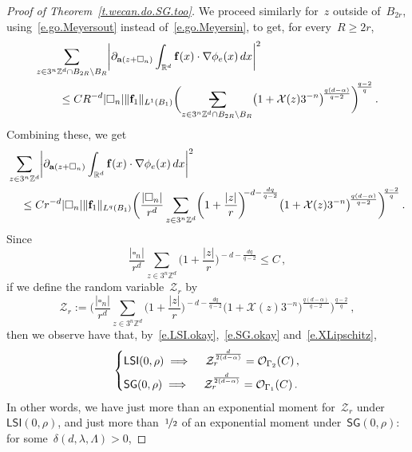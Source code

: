 \documentclass[11pt,twoside]{article} %
\makeatletter
\let\oldsquare\square %
\renewcommand{\square}{\oldsquare}
\numberwithin{equation}{section}
\theoremstyle{definition}
\let\originalleft\left
\let\originalright\right
\renewcommand{\left}{\mathopen{}\mathclose\bgroup\originalleft}
\renewcommand{\right}{\aftergroup\egroup\originalright}
\newcommand*{\Zd}{\ensuremath{\mathbb{Z}^d}}
\newcommand*{\Rd}{\ensuremath{\mathbb{R}^d}}
\newcommand{\f}{\mathbf{f}}
\renewcommand{\a}{\mathbf{a}}
\newcommand{\cu}{\square}
\newcommand{\X}{\mathcal{X}}
\renewcommand{\O}{\mathcal{O}}
\newcommand{\avsum}{\mathop{\mathpalette\avsuminner\relax}\displaylimits}
\newcommand\avsuminner[2]{%
  {\sbox0{$\m@th#1\sum$}%
   \vphantom{\usebox0}%
   \ooalign{%
     \hidewidth
     \smash{\,\rule[.23em]{8.8pt}{1.1pt} \relax}%
     \hidewidth\cr
   ~$\m@th#1\sum$\cr
   }%
  }%
}
\newcommand{\LSI}{\mathsf{LSI}}
\newcommand{\SG}{\mathsf{SG}}
\makeatother
\begin{document}
\begin{proof}[{Proof of Theorem~\ref{t.wecan.do.SG.too}}]
We proceed similarly for~$z$ outside of~$B_{2r}$, using~\eqref{e.go.Meyersout} instead of~\eqref{e.go.Meyersin}, to get, for every~$R\geq 2r$, 
\begin{align*}
\lefteqn{ \sum_{z\in 3^n\Zd\cap B_{2R} \setminus B_R} \left|  \partial_{\a(z+\cu_n)} \int_{\Rd} \f(x)\cdot \nabla \phi_e(x)\,dx
\right|^2
} \qquad & 
\notag \\ & 
\leq
CR^{-d}  |\cu_n|  \| \f_1\|_{L^1(B_1)} 
\biggl( \avsum_{z\in 3^n\Zd\cap B_{2R} \setminus B_R}
\bigl(1+\X(z) 3^{-n} \bigr)^{\! \frac{q(d-\alpha)}{q-2}}
\biggr)^{\!\!\frac{q-2}{q} }
\,.
\end{align*}
Combining these, we get
\begin{align*}
\lefteqn{ \sum_{z\in 3^n\Zd} \left|  \partial_{\a(z+\cu_n)} \int_{\Rd} \f(x)\cdot \nabla \phi_e(x)\,dx
\right|^2
} \quad & 
\notag \\ & 
\leq
C r^{-d} |\cu_n|  \| \f_1\|_{L^q(B_1)} 
\biggl( 
\frac{|\cu_n|}{r^d}
\sum_{z\in 3^n\Zd}
\biggl( 1+ 
\frac{|z|}{r} 
\biggr)^{\!\!-d-\frac{dq}{q-2}}
\bigl(1+\X(z) 3^{-n} \bigr)^{\! \frac{q(d-\alpha)}{q-2}}
\biggr)^{\!\!\frac{q-2}{q} }
\,.
\end{align*}
Since 
\begin{equation*}
\frac{|\cu_n|}{r^d}
\sum_{z\in 3^n\Zd}
\biggl( 1+ 
\frac{|z|}{r} 
\biggr)^{\!\!-d-\frac{dq}{q-2}}  \leq C\,,
\end{equation*}
if we define the random variable~$\mathcal{Z}_r$ by
\begin{equation*}
\mathcal{Z}_r
:= 
\biggl( 
\frac{|\cu_n|}{r^d}
\sum_{z\in 3^n\Zd}
\biggl( 1+ 
\frac{|z|}{r} 
\biggr)^{\!\!-d-\frac{dq}{q-2}}
\bigl(1+\X(z) 3^{-n} \bigr)^{\! \frac{q(d-\alpha)}{q-2}}
\biggr)^{\!\!\frac{q-2}{q} }\,,
\end{equation*}
then we observe have that, by~\eqref{e.LSI.okay},~\eqref{e.SG.okay} and~\eqref{e.XLipschitz},
\begin{equation*}
\left\{
\begin{aligned}
& \LSI(0,\rho) 
\implies \quad 
\mathcal{Z}_r^{\frac{d}{2(d-\alpha)}  } 
= 
\O_{\Gamma_2}(C)\,, \\
& 
\SG(0,\rho) 
\implies \quad 
\mathcal{Z}_r^{\frac{d}{2(d-\alpha)}  } 
= 
\O_{\Gamma_1}(C) \,.
\end{aligned}
\right.
\end{equation*}
In other words, we have just more than an exponential moment for~$\mathcal{Z}_r$ under~$\LSI(0,\rho)$, and just more than~$\nicefrac12$ of an exponential moment under~$\SG(0,\rho)$: for some~$\delta(d,\lambda,\Lambda)>0$,

\end{proof}
\end{document}
